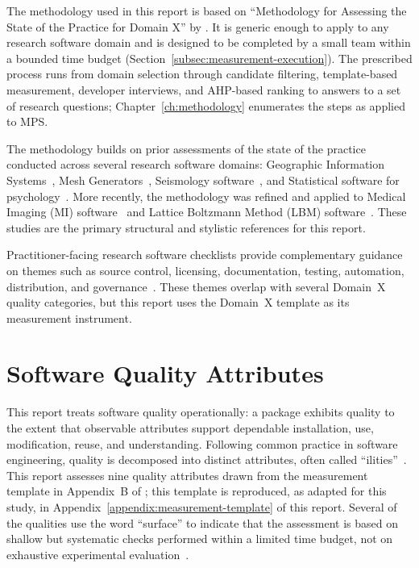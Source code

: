 The methodology used in this report is based on ``Methodology for Assessing the State of the Practice for Domain X'' by \citet{Smith2021}. It is generic enough to apply to any research software domain and is designed to be completed by a small team within a bounded time budget (Section~\ref{subsec:measurement-execution}). The prescribed process runs from domain selection through candidate filtering, template-based measurement, developer interviews, and AHP-based ranking to answers to a set of research questions; Chapter~\ref{ch:methodology} enumerates the steps as applied to MPS.

The methodology builds on prior assessments of the state of the practice conducted across several research software domains: Geographic Information Systems~\citep{smith2018state}, Mesh Generators~\citep{smith2016state}, Seismology software~\citep{Smith2018Seismology}, and Statistical software for psychology~\citep{smith2018statistical}. More recently, the methodology was refined and applied to Medical Imaging (MI) software~\citep{Smith2024MI} and Lattice Boltzmann Method (LBM) software~\citep{Smith2024LBM,Michalski2021}. These studies are the primary structural and stylistic references for this report.

Practitioner-facing research software checklists provide complementary guidance on themes such as source control, licensing, documentation, testing, automation, distribution, and governance~\citep{Acton2026Checklists}. These themes overlap with several Domain~X quality categories, but this report uses the Domain~X template as its measurement instrument.

\section{Software Quality Attributes}
\label{sec:software-quality-attributes}

This report treats software quality operationally: a package exhibits quality to the extent that observable attributes support dependable installation, use, modification, reuse, and understanding. Following common practice in software engineering, quality is decomposed into distinct attributes, often called ``ilities''~\citep{Smith2021}. This report assesses nine quality attributes drawn from the measurement template in Appendix~B of \citet{Smith2021}; this template is reproduced, as adapted for this study, in Appendix~\ref{appendix:measurement-template} of this report. Several of the qualities use the word ``surface'' to indicate that the assessment is based on shallow but systematic checks performed within a limited time budget, not on exhaustive experimental evaluation~\citep{Smith2024MI}.

